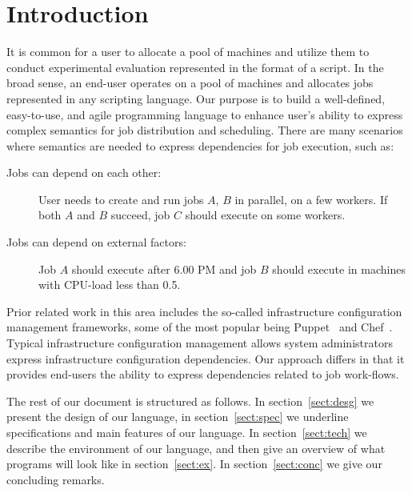 \section{Introduction}
\label{sect:intro}

It is common for a user to allocate a pool of machines and utilize them to
conduct experimental evaluation represented in the format of a script. In the
broad sense, an end-user operates on a pool of machines and allocates jobs
represented in any scripting language. Our purpose is to build a well-defined,
easy-to-use, and agile programming language to enhance user's ability to express
complex semantics for job distribution and scheduling. There are many scenarios
where semantics are needed to express dependencies for job execution, such as:
\begin{description}
\item[Jobs can depend on each other:] User needs to create and run jobs $A$,
$B$ in parallel, on a few workers. If both $A$ and $B$ succeed, job $C$ should
execute on some workers.
\item[Jobs can depend on external factors:] Job $A$ should execute after 6.00 PM
and job $B$ should execute in machines with CPU-load less than 0.5.
\end{description}

Prior related work in this area includes the so-called infrastructure
configuration management frameworks, some of the most popular being
Puppet~\cite{puppet} and Chef~\cite{chef}. Typical infrastructure
configuration management allows system administrators express
infrastructure configuration dependencies. Our approach differs in that
it provides end-users the ability to express dependencies related to
job work-flows.

The rest of our document is structured as follows. In section~\ref{sect:desg} we
present the design of our language, in section~\ref{sect:spec} we underline
specifications and main features of our language. In section~\ref{sect:tech} we
describe the environment of our language, and then give an overview of what
programs will look like in section~\ref{sect:ex}. In section~\ref{sect:conc} we
give our concluding remarks.
